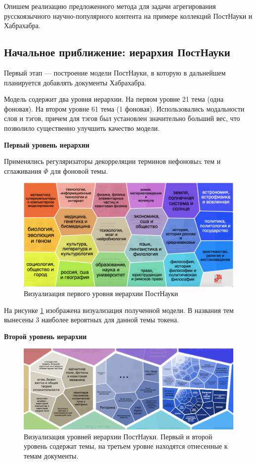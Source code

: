 Опишем реализацию предложенного метода для задачи агрегирования русскоязычного научно-популярного контента на примере коллекций ПостНауки и Хабрахабра.

\subsection{Начальное приближение: иерархия ПостНауки} 

Первый этап --- построение модели ПостНауки, в которую в дальнейшем планируется добавлять документы Хабрахабра. 

 Модель содержит два уровня иерархии. На первом уровне 21 тема (одна фоновая). На втором уровне 61 тема (1 фоновая). Использовались модальности слов и тэгов, причем для тэгов был установлен значительно больший вес, что позволило существенно улучшить качество модели.

\textbf{Первый уровень иерархии}

Применялись регуляризаторы декорреляции терминов нефоновыx тем и сглаживания $\Phi$ для фоновой темы.

\begin{figure}[h]
    \centering 
    \includegraphics[width=1\textwidth]{img/pn_level0.png}
    \caption{\label{fig:pn_level0}Визуализация первого уровня иерархии ПостНауки}
\end{figure}

На рисунке \ref{fig:pn_level0} изображена визуализация полученной модели. В названия тем вынесены 3 наиболее вероятных для данной темы токена. 


\textbf{Второй уровень иерархии}
 
\begin{figure}[h]
    \centering 
    \includegraphics[width=1\textwidth]{img/pn_level1.png}
    \caption{\label{fig:pn_level1}Визуализация уровней иерархии ПостНауки. Первый и второй уровень содержат темы, на третьем уровне находятся отнесенные к темам документы.}
    \end{figure}

